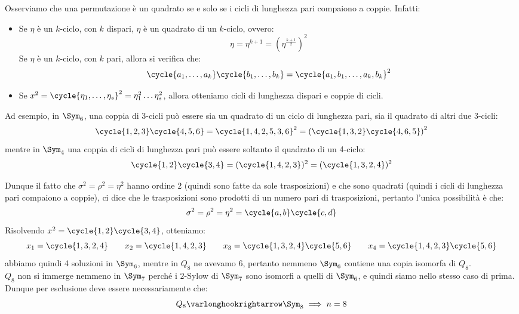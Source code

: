 \documentclass[11pt]{scrartcl}
\begin{document}
\begin{soln}
    \begin{remark}
        Osserviamo che una permutazione è un quadrato se e solo se i cicli di lunghezza pari compaiono a coppie. Infatti:
            \begin{itemize}
                \item Se $\eta$ è un $k$-ciclo, con $k$ dispari, $\eta$ è un quadrato di un $k$-ciclo, ovvero:
                        \[ \eta = \eta^{k+1} = \left(\eta^{\frac{k+1}{2}}\right)^2
                            \]
                Se $\eta$ è un $k$-ciclo, con $k$ pari, allora si verifica che:
                        \[ \cycle{a_1,\ldots,a_k}\cycle{b_1,\ldots,b_k} = \cycle{a_1,b_1,\ldots,a_k,b_k}^2
                            \]
                \item Se $x^2 = \cycle{\eta_1, \ldots, \eta_s}^2 = \eta_1^2 \ldots \eta_s^2$, allora otteniamo cicli di lunghezza dispari e coppie di cicli.
            \end{itemize}
        Ad esempio, in $\Sym_{6}$, una coppia di 3-cicli può essere sia un quadrato di un ciclo di lunghezza pari, sia il quadrato di altri due 3-cicli:
            \[ \cycle{1,2,3}\cycle{4,5,6} = \cycle{1,4,2,5,3,6}^2 = \left(\cycle{1,3,2}\cycle{4,6,5}\right)^2
                \]
        mentre in $\Sym_4$ una coppia di cicli di lunghezza pari può essere soltanto il quadrato di un 4-ciclo:
            \[ \cycle{1,2}\cycle{3,4} = (\cycle{1,4,2,3})^2 = (\cycle{1,3,2,4})^2
                \]
    \end{remark}
    Dunque il fatto che $\sigma^2 = \rho^2 = \eta^2$ hanno ordine $2$ (quindi sono fatte da sole trasposizioni) e che sono quadrati (quindi i cicli di lunghezza pari compaiono a coppie),
    ci dice che le trasposizioni sono prodotti di un numero pari di trasposizioni, pertanto l'unica possibilità è che:
        \[ \sigma^2 = \rho^2 = \eta^2 = \cycle{a,b}\cycle{c,d}
            \]
    Risolvendo $x^2 = \cycle{1,2}\cycle{3,4}$, otteniamo:
        \[ x_1 = \cycle{1,3,2,4} \qquad x_2 = \cycle{1,4,2,3} \qquad x_3 = \cycle{1,3,2,4}\cycle{5,6} \qquad x_4 = \cycle{1,4,2,3}\cycle{5,6}
            \]
    abbiamo quindi 4 soluzioni in $\Sym_{6}$, mentre in $Q_8$ ne avevamo 6, pertanto nemmeno $\Sym_{6}$ contiene una copia isomorfa di $Q_8$.\\
    $Q_8$ non si immerge nemmeno in $\Sym_{7}$ perché i $2$-Sylow di $\Sym_{7}$ sono isomorfi a quelli di $\Sym_{6}$, e quindi siamo nello stesso caso di prima. \\
    Dunque per esclusione deve essere necessariamente che:
        \[ Q_8 \varlonghookrightarrow \Sym_{8} \implies n = 8
\]
\end{soln}
\end{document}
